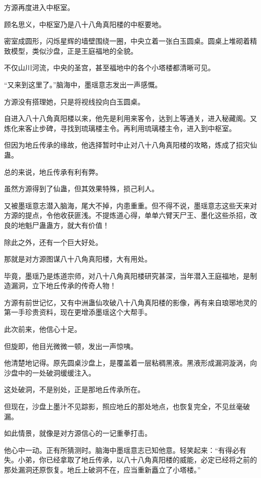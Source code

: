 
\begin{this_body}

方源再度进入中枢室。

顾名思义，中枢室乃是八十八角真阳楼的中枢要地。

密室成圆形，闪烁星辉的墙壁围绕一圈，中央立着一张白玉圆桌。圆桌上堆砌着精致模型，类似沙盘，正是王庭福地的全貌。

不仅山川河流，中央的圣宫，甚至福地中的各个小塔楼都清晰可见。

“又来到这里了。”脑海中，墨瑶意志发出一声感慨。

方源没有搭理她，只是将视线投向白玉圆桌。

自进入八十八角真阳楼以来，他先是利用来客令，达到上等通关，进入秘藏阁。又炼化来客止步碑，寻找到琉璃楼主令。再利用琉璃楼主令，进入到中枢室。

但因为地丘传承的缘故，他选择暂时中止对八十八角真阳楼的攻略，炼成了招灾仙蛊。

总的来说，地丘传承有利有弊。

虽然方源得到了仙蛊，但其效果特殊，损己利人。

又被墨瑶意志潜入脑海，尾大不掉，内患重重。但不得不说，墨瑶意志这些天来对方源的提点，令他收获匪浅。不提炼道心得，单单六臂天尸王、墨化这些杀招，改良的地魁尸蛊蛊方，就大有价值！

除此之外，还有一个巨大好处。

那就是对方源图谋八十八角真阳楼，大有用处。

毕竟，墨瑶乃是炼道宗师，对八十八角真阳楼研究甚深，当年潜入王庭福地，是制造漏洞，立下地丘传承的传奇人物！

方源有前世记忆，又有中洲蛊仙攻破八十八角真阳楼的影像，再有来自琅琊地灵的第一手珍贵资料，现在更增添墨瑶这个大帮手。

此次前来，他信心十足。

但旋即，他目光微微一顿，发出一声惊咦。

他清楚地记得。原先圆桌沙盘上，是覆盖着一层粘稠黑液。黑液形成漏洞漩涡，向沙盘中的一处破洞缓缓注入。

这处破洞，不是别处，正是那地丘传承所在。

但现在，沙盘上墨汁不见踪影，照应地丘的那处地点，也恢复完全，不见丝毫破漏。

如此情景，就像是对方源信心的一记重拳打击。

他心中一动。正有所猜测时。脑海中墨瑶意志已知他意。轻笑起来：“有得必有失。小弟，你已经拿取了地丘传承，以八十八角真阳楼的威能，必定已经将之前的那处漏洞还原恢复。地丘上破洞不在，应当重新矗立了小塔楼。”


\end{this_body}
